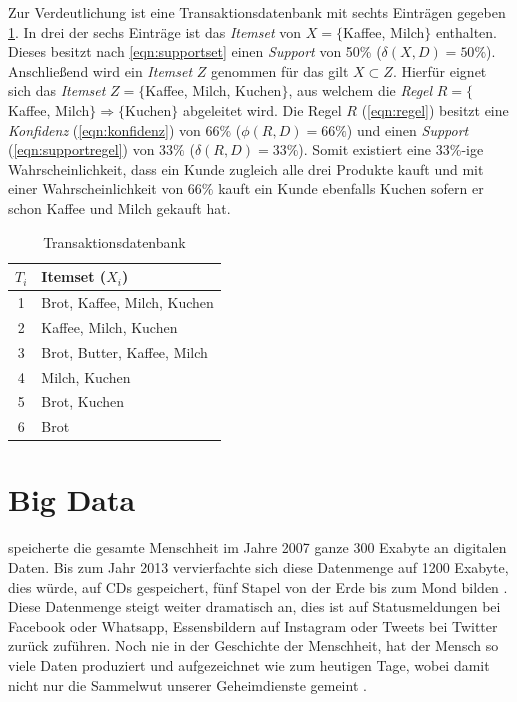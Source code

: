 \documentclass[12pt,journal,compsoc,ngerman]{IEEEtran}
\begin{document}
Zur Verdeutlichung ist eine Transaktionsdatenbank mit sechts Einträgen gegeben \cref{tab:database}. In drei der sechs Einträge ist das \emph{Itemset} von $X = \{$Kaffee, Milch$\}$ enthalten. Dieses besitzt nach \cref{eqn:supportset} einen \emph{Support} von 50\% ($\delta(X, D) = 50\%$). Anschließend wird ein \emph{Itemset} $Z$ genommen für das gilt $X \subset Z$. Hierfür eignet sich das \emph{Itemset} $Z = \{$Kaffee, Milch, Kuchen$\}$, aus welchem die \emph{Regel} $R = \{$Kaffee, Milch$\}\Rightarrow\{$Kuchen$\}$ abgeleitet wird. Die Regel $R$ (\cref{eqn:regel}) besitzt eine \emph{Konfidenz} (\cref{eqn:konfidenz}) von $66\%$ ($\phi(R, D) = 66\%$) und einen \emph{Support} (\cref{eqn:supportregel}) von $33\%$ ($\delta(R, D) = 33\%$). Somit existiert eine $33\%$-ige Wahrscheinlichkeit, dass ein Kunde zugleich alle drei Produkte kauft und mit einer Wahrscheinlichkeit von  $66\%$ kauft ein Kunde ebenfalls Kuchen sofern er schon Kaffee und Milch gekauft hat.
\begin{table}[!t]
\caption{Transaktionsdatenbank}
\centering
\begin{tabular}{c|l}
$T_i$ & Itemset ($X_i$)\\ \hline
1 & Brot, Kaffee, Milch, Kuchen\\
2 & Kaffee, Milch, Kuchen\\
3 & Brot, Butter, Kaffee, Milch\\
4 & Milch, Kuchen\\
5 & Brot, Kuchen\\
6 & Brot
\end{tabular}
\label{tab:database}
\end{table}
  
\section{Big Data}
 speicherte die gesamte Menschheit im Jahre 2007 ganze 300 Exabyte an digitalen Daten. Bis zum Jahr 2013 vervierfachte sich diese Datenmenge auf 1200 Exabyte, dies würde, auf CDs gespeichert, fünf Stapel von der Erde bis zum Mond bilden \cite{mayer2014big}. Diese Datenmenge steigt weiter dramatisch an, dies ist auf Statusmeldungen bei Facebook oder Whatsapp, Essensbildern auf Instagram oder Tweets bei Twitter zurück zuführen. Noch nie in der Geschichte der Menschheit, hat der Mensch so viele Daten produziert und aufgezeichnet wie zum heutigen Tage, wobei damit nicht nur die Sammelwut unserer Geheimdienste gemeint \cite{nsa_classification_cuide:Online}.
 
\end{document}
